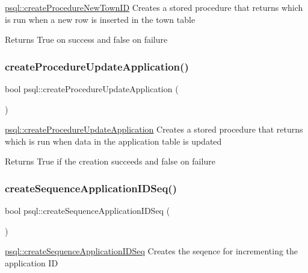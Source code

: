 \mbox{\hyperlink{classpsql_ade0c7fa4f019c3f349230af09b1de49e}{psql\+::create\+Procedure\+New\+Town\+ID}} Creates a stored procedure that returns which is run when a new row is inserted in the town table 

\begin{DoxyReturn}{Returns}
True on success and false on failure 
\end{DoxyReturn}
\mbox{\label{classpsql_a28f3e3d6309e3ce57493db284c099946}} 
\subsubsection{\texorpdfstring{createProcedureUpdateApplication()}{createProcedureUpdateApplication()}}
{\footnotesize\ttfamily bool psql\+::create\+Procedure\+Update\+Application (\begin{DoxyParamCaption}{ }\end{DoxyParamCaption})}



\mbox{\hyperlink{classpsql_a28f3e3d6309e3ce57493db284c099946}{psql\+::create\+Procedure\+Update\+Application}} Creates a stored procedure that returns which is run when data in the application table is updated 

\begin{DoxyReturn}{Returns}
True if the creation succeeds and false on failure 
\end{DoxyReturn}
\mbox{\label{classpsql_a54c75d0896ee6aad58e22c830895c106}} 
\subsubsection{\texorpdfstring{createSequenceApplicationIDSeq()}{createSequenceApplicationIDSeq()}}
{\footnotesize\ttfamily bool psql\+::create\+Sequence\+Application\+I\+D\+Seq (\begin{DoxyParamCaption}{ }\end{DoxyParamCaption})}



\mbox{\hyperlink{classpsql_a54c75d0896ee6aad58e22c830895c106}{psql\+::create\+Sequence\+Application\+I\+D\+Seq}} Creates the seqence for incrementing the application ID 

